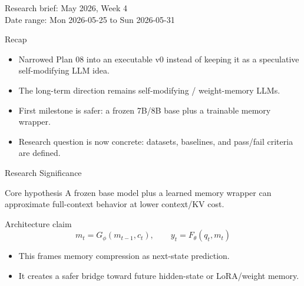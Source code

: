 
\begin{frame}
  \titlepage
  \vspace{-1.0em}
  \begin{center}
    \small Research brief: May 2026, Week 4 \\
    \scriptsize Date range: Mon 2026-05-25 to Sun 2026-05-31
  \end{center}
\end{frame}

\begin{frame}{Recap}
  \begin{itemize}
    \item Narrowed Plan 08 into an executable v0 instead of keeping it as a speculative self-modifying LLM idea.
    \item The long-term direction remains self-modifying / weight-memory LLMs.
    \item First milestone is safer: a frozen 7B/8B base plus a trainable memory wrapper.
    \item Research question is now concrete: datasets, baselines, and pass/fail criteria are defined.
  \end{itemize}
\end{frame}

\begin{frame}{Research Significance}
  \begin{block}{Core hypothesis}
    A frozen base model plus a learned memory wrapper can approximate full-context behavior at lower context/KV cost.
  \end{block}

  \begin{block}{Architecture claim}
    \[
      m_t = G_\phi(m_{t-1}, c_t), \qquad y_t = F_\theta(q_t, m_t)
    \]
  \end{block}

  \begin{itemize}
    \item This frames memory compression as next-state prediction.
    \item It creates a safer bridge toward future hidden-state or LoRA/weight memory.
  \end{itemize}
\end{frame}

